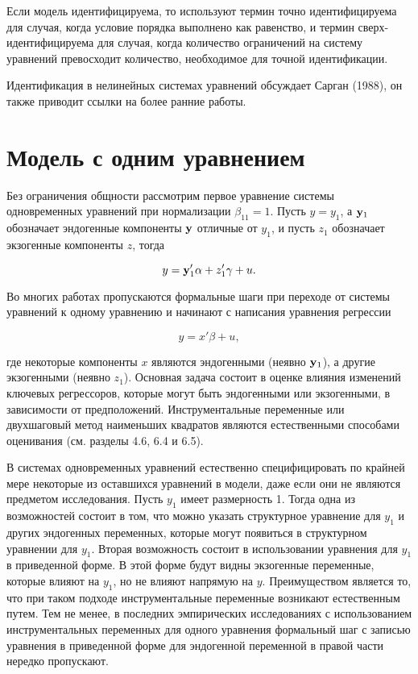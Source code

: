 Если модель идентифицируема, то используют термин точно идентифицируема для случая, когда условие порядка выполнено как равенство, и  термин сверх-идентифицируема для случая, когда количество ограничений на систему уравнений превосходит количество, необходимое для точной идентификации.

Идентификация в нелинейных системах уравнений обсуждает Сарган (1988), он также приводит ссылки на более ранние работы.
	
\section{Модель с одним уравнением}


Без ограничения общности рассмотрим первое уравнение системы одновременных уравнений при нормализации $\beta_{11}=1$. Пусть $y=y_{1}$, а $\mathbf{y}_{1}$ обозначает эндогенные компоненты $\mathbf{y}$ отличные от $y_{1}$, и пусть $z_{1}$ обозначает экзогенные компоненты $z$, тогда


\begin{equation}
y=\mathbf{y}'_{1}\alpha+z'_{1}\gamma+u.
\end{equation}

Во многих работах пропускаются формальные шаги при переходе от системы уравнений к одному уравнению и начинают с написания уравнения регрессии

\[
y=x'\beta+u,
\]

где некоторые компоненты $x$ являются эндогенными (неявно $\mathbf{y}_{1}$), а другие экзогенными (неявно $z_{1}$).
Основная задача состоит в оценке влияния изменений  ключевых регрессоров, которые могут быть эндогенными или экзогенными, в зависимости от предположений. Инструментальные переменные или двухшаговый метод наименьших квадратов являются естественными способами оценивания (см. разделы 4.6, 6.4 и 6.5).


В системах одновременных уравнений естественно специфицировать по крайней мере некоторые из оставшихся уравнений в модели, даже если они не являются предметом исследования. Пусть $y_{1}$ имеет размерность 1. Тогда одна из возможностей состоит в том, что можно указать структурное уравнение для $y_{1}$ и других эндогенных переменных, которые могут появиться в  структурном  уравнении для $y_{1}$. Вторая возможность состоит в использовании уравнения для  $y_{1}$ в приведенной форме. В этой форме будут видны экзогенные переменные, которые влияют на $y_{1}$, но не влияют напрямую на $y$. Преимуществом является то, что при таком подходе инструментальные переменные возникают естественным путем. Тем не менее, в последних эмпирических исследованиях с использованием инструментальных переменных для одного уравнения формальный шаг с записью уравнения в приведенной форме для эндогенной переменной в правой части нередко пропускают.
	
